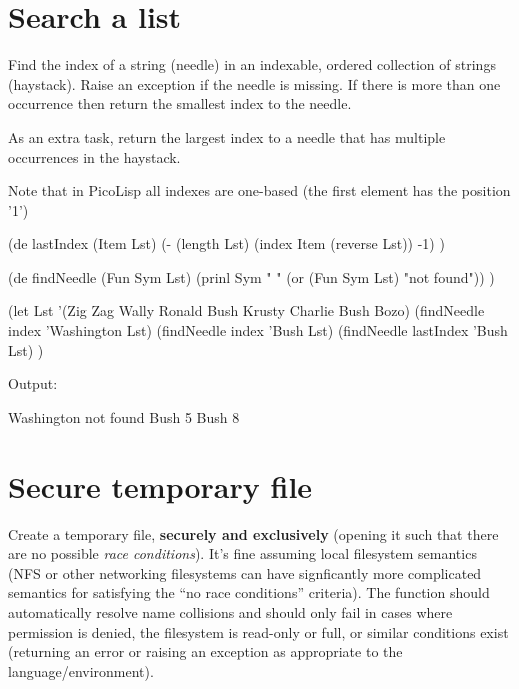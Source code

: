 \pagebreak{}
\section*{Search a list}

Find the index of a string (needle) in an indexable, ordered
collection of strings (haystack). Raise an exception if the needle is
missing. If there is more than one occurrence then return the smallest
index to the needle.

As an extra task, return the largest index to a needle that has multiple
occurrences in the haystack.

\begin{wideverbatim}

Note that in PicoLisp all indexes are one-based
(the first element has the position '1')

(de lastIndex (Item Lst)
   (- (length Lst) (index Item (reverse Lst)) -1) )

(de findNeedle (Fun Sym Lst)
   (prinl Sym " " (or (Fun Sym Lst) "not found")) )

(let Lst '(Zig Zag Wally Ronald Bush Krusty Charlie Bush Bozo)
   (findNeedle index 'Washington Lst)
   (findNeedle index 'Bush Lst)
   (findNeedle lastIndex 'Bush Lst) )

Output:

Washington not found
Bush 5
Bush 8

\end{wideverbatim}

\pagebreak{}
\section*{Secure temporary file}

Create a temporary file, \textbf{securely and exclusively} (opening it
such that there are no possible \emph{race
conditions}). It's fine assuming local filesystem semantics (NFS or
other networking filesystems can have signficantly more complicated
semantics for satisfying the ``no race conditions'' criteria). The
function should automatically resolve name collisions and should only
fail in cases where permission is denied, the filesystem is read-only or
full, or similar conditions exist (returning an error or raising an
exception as appropriate to the language/environment).


